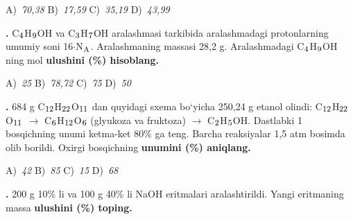 \documentclass[11pt,a4paper]{article}
\renewcommand{\textsubscript}[1]{\ensuremath{_{\text{\fontsize{8}{8}\selectfont #1}}}}
\newcommand{\qn}[1]{\textbf{\fontsize{11.5}{13}\selectfont #1}}
\newcommand{\qsep}{\par\vspace{13pt}}
\begin{document}
\begin{multicols}{2}
\noindent A)~\textsl{70,38} \hfill B)~\textsl{17,59} \hfill C)~\textsl{35,19} \hfill D)~\textsl{43,99}\par
\qsep
\noindent\qn{28.} C\textsubscript{4}H\textsubscript{9}OH va C\textsubscript{3}H\textsubscript{7}OH aralashmasi tarkibida aralashmadagi protonlarning umumiy soni 16$\cdot$N\textsubscript{A}. Aralashmaning massasi 28,2 g. Aralashmadagi C\textsubscript{4}H\textsubscript{9}OH ning mol \textbf{ulushini (\%) hisoblang.}

\noindent A)~\textsl{25} \hfill B)~\textsl{78,72} \hfill C)~\textsl{75} \hfill D)~\textsl{50}\par
\qsep
\noindent\qn{29.} 684 g C\textsubscript{12}H\textsubscript{22}O\textsubscript{11} dan quyidagi sxema bo`yicha 250,24 g etanol olindi: C\textsubscript{12}H\textsubscript{22}O\textsubscript{11} $\to$ C\textsubscript{6}H\textsubscript{12}O\textsubscript{6} (glyukoza va fruktoza) $\to$ C\textsubscript{2}H\textsubscript{5}OH. Dastlabki 1 bosqichning unumi ketma-ket 80\% ga teng. Barcha reaksiyalar 1,5 atm bosimda olib borildi. Oxirgi bosqichning \textbf{unumini (\%) aniqlang.}

\noindent A)~\textsl{42} \hfill B)~\textsl{85} \hfill C)~\textsl{15} \hfill D)~\textsl{68}\par
\qsep
\noindent\qn{30.} 200 g 10\% li va 100 g 40\% li NaOH eritmalari aralashtirildi. Yangi eritmaning massa \textbf{ulushini (\%) toping.}


\end{multicols}
\end{document}
